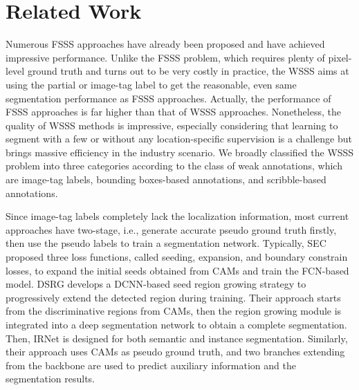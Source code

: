 \documentclass[journal]{IEEEtran}
\begin{document}
\section{Related Work}
\label{related}
Numerous FSSS approaches have already been proposed and have achieved impressive performance. Unlike the FSSS problem, which requires plenty of pixel-level ground truth and turns out to be very costly in practice, the WSSS aims at using the partial or image-tag label to get the reasonable, even same segmentation performance as FSSS approaches. Actually, the performance of FSSS approaches is far higher than that of WSSS approaches. Nonetheless, the quality of WSSS methods is impressive, especially considering that learning to segment with a few or without any location-specific supervision is a challenge but brings massive efficiency in the industry scenario. We broadly classified the WSSS problem into three categories according to the class of weak annotations, which are image-tag labels, bounding boxes-based annotations, and scribble-based annotations. 

Since image-tag labels completely lack the localization information, most current approaches have two-stage, i.e., generate accurate pseudo ground truth firstly, then use the pseudo labels to train a segmentation network. Typically, SEC \cite{kolesnikov2016seed} proposed three loss functions, called seeding, expansion, and boundary constrain losses, to expand the initial seeds obtained from CAMs \cite{zhou2016learning} and train the FCN-based model. DSRG \cite{huang2018weakly} develops a DCNN-based seed region growing strategy to progressively extend the detected region during training. Their approach starts from the discriminative regions from CAMs, then the region growing module is integrated into a deep segmentation network to obtain a complete segmentation. Then, IRNet \cite{ahn2019weakly} is designed for both semantic and instance segmentation. Similarly, their approach uses CAMs as pseudo ground truth, and two branches extending from the backbone are used to predict auxiliary information and the segmentation results. 
\end{document}
